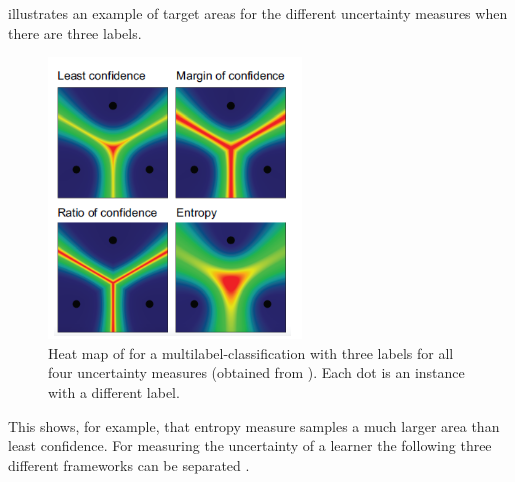  illustrates an example of target areas for the different uncertainty measures when there are three labels.
\begin{figure}[t]
  \centering
    \includegraphics[width=0.60\textwidth]{figures/uncertainty_sampling_heatmap.PNG}
  \caption{Heat map of for a multilabel-classification with three labels for all four uncertainty measures (obtained from \cite{human-in-the-loop}).
  Each dot is an instance with a different label.}
  \label{fig:uncertainty_sampling_heatmap}
\end{figure}
This shows, for example, that entropy measure samples a much larger area than least confidence.
For measuring the uncertainty of a learner the following three different frameworks can be separated \cite{nguyen2021howtomeasure}.
%


